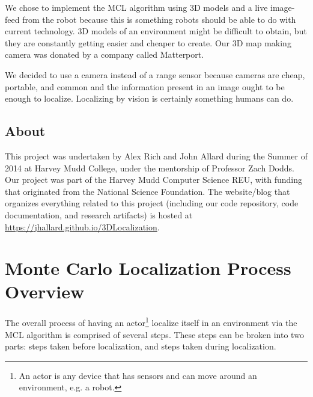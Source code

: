 \documentclass[a4paper,11pt]{article}
\begin{document}
We chose to implement the MCL algorithm using 3D models and a live image-feed from the robot because  this is something robots should be able to do with current technology. 3D models of an environment might be difficult to obtain, but they are constantly getting easier and cheaper to create. Our 3D map making camera was donated by a company called Matterport. 
 
We decided to use a camera instead of a range sensor because cameras are cheap, portable, and common and the information present in an image ought to be enough to localize. Localizing by vision is certainly something humans can do.

 \subsection{About}
 This project was undertaken by Alex Rich and John Allard during the Summer of 2014 at Harvey Mudd College, under the mentorship of Professor Zach Dodds. Our project was part of the Harvey Mudd Computer Science REU, with funding that originated from the National Science Foundation. The website/blog that organizes everything related to this project (including our code repository, code documentation, and research artifacts) is hosted at \\\url{https://jhallard.github.io/3DLocalization}.


  \section{Monte Carlo Localization Process Overview}

The overall process of having an actor\footnote{An actor is any device that has sensors and can move around an environment, e.g. a robot.} localize itself in an environment via the MCL algorithm is comprised of several steps. These steps can be broken into two parts: steps taken before localization, and steps taken during localization.
\end{document}
